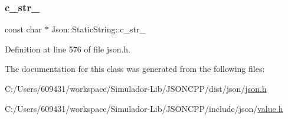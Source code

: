 \subsubsection{\texorpdfstring{c\+\_\+str\+\_\+}{c\_str\_}}
{\footnotesize\ttfamily const char $\ast$ Json\+::\+Static\+String\+::c\+\_\+str\+\_\+\hspace{0.3cm}{\ttfamily [private]}}



Definition at line 576 of file json.\+h.



The documentation for this class was generated from the following files\+:\begin{DoxyCompactItemize}
\item 
C\+:/\+Users/609431/workspace/\+Simulador-\/\+Lib/\+J\+S\+O\+N\+C\+P\+P/dist/json/\hyperlink{dist_2json_2json_8h}{json.\+h}\item 
C\+:/\+Users/609431/workspace/\+Simulador-\/\+Lib/\+J\+S\+O\+N\+C\+P\+P/include/json/\hyperlink{value_8h}{value.\+h}\end{DoxyCompactItemize}
